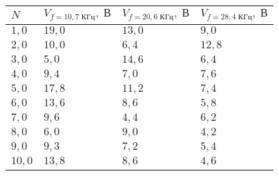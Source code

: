 \begin{tabular}{|l|l|l|l|}
\hline
$N$ & $V_{f=10{,}7\;\text{КГц}},\;\text{В}$ & $V_{f=20{,}6\;\text{КГц}},\;\text{В}$ & $V_{f=28{,}4\;\text{КГц}},\;\text{В}$\\\hline
$1{,}0$ & $19{,}0$ & $13{,}0$ & $9{,}0$\\\hline
$2{,}0$ & $10{,}0$ & $6{,}4$ & $12{,}8$\\\hline
$3{,}0$ & $5{,}0$ & $14{,}6$ & $6{,}4$\\\hline
$4{,}0$ & $9{,}4$ & $7{,}0$ & $7{,}6$\\\hline
$5{,}0$ & $17{,}8$ & $11{,}2$ & $7{,}4$\\\hline
$6{,}0$ & $13{,}6$ & $8{,}6$ & $5{,}8$\\\hline
$7{,}0$ & $9{,}6$ & $4{,}4$ & $6{,}2$\\\hline
$8{,}0$ & $6{,}0$ & $9{,}0$ & $4{,}2$\\\hline
$9{,}0$ & $9{,}3$ & $7{,}2$ & $5{,}4$\\\hline
$10{,}0$ & $13{,}8$ & $8{,}6$ & $4{,}6$\\\hline
\end{tabular}
